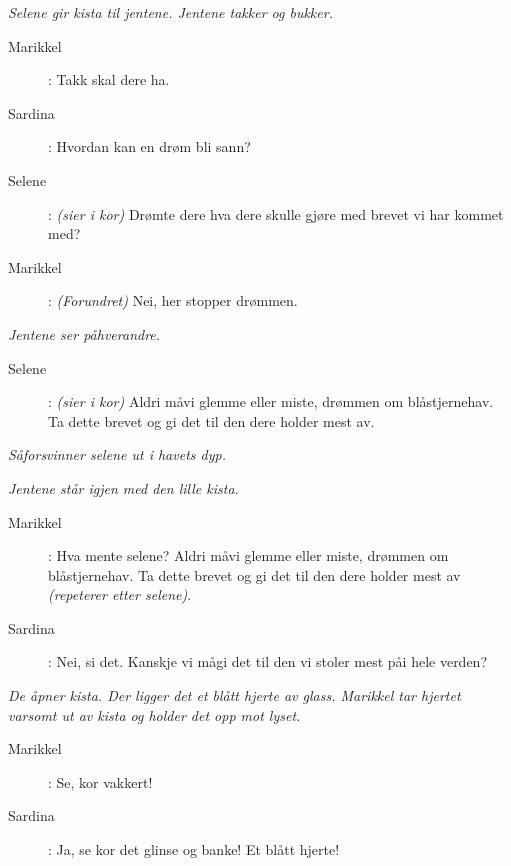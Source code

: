 {\begin{quote}
\begin{guitar}
\end{guitar}
\end{quote}

\noindent \textit{\color{gray} Selene gir kista til jentene. Jentene takker og bukker.} 

\begin{description}
\item[Marikkel]: Takk skal dere ha. 
\item[Sardina]: Hvordan kan en dr\o{}m bli sann? 
\item[Selene]: \textit{\color{gray} (sier i kor)} Dr\o{}mte dere hva dere skulle gj\o{}re med brevet vi har kommet med? 
\item[Marikkel]: \textit{\color{gray} (Forundret)} Nei, her stopper dr\o{}mmen. 
\end{description}

\noindent \textit{\color{gray} Jentene ser p\aa  hverandre.}

\begin{description}
\item[Selene]: \textit{\color{gray} (sier i kor)} Aldri m\aa  vi glemme eller miste, dr\o{}mmen om bl\aa stjernehav. Ta dette brevet og gi det til den dere holder mest av. 
\end{description}

\noindent \textit{\color{gray} S\aa  forsvinner selene ut i havets dyp.}

\noindent \textit{\color{gray} Jentene st\aa r igjen med den lille kista.} 

\begin{description}
\item[Marikkel]: Hva mente selene? Aldri m\aa  vi glemme eller miste, dr\o{}mmen om bl\aa stjernehav. Ta dette brevet og gi det til den dere holder mest av \textit{\color{gray} (repeterer etter selene)}. 
\item[Sardina]: Nei, si det. Kanskje vi m\aa  gi det til den vi stoler mest p\aa  i hele verden? 
\end{description}

\noindent \textit{\color{gray} De \aa pner kista. Der ligger det et bl\aa tt hjerte av glass. Marikkel tar hjertet varsomt ut av kista og holder det opp mot lyset.}

\begin{description}
\item[Marikkel]: Se, kor vakkert!
\item[Sardina]: Ja, se kor det glinse og banke! Et bl\aa tt hjerte!
\end{description}

}
